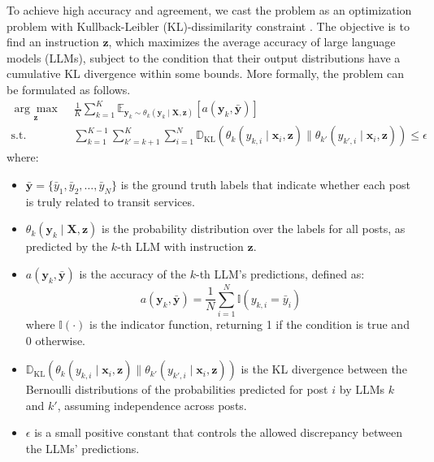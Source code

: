 \documentclass[a4paper,fleqn,12pt]{cas-sc}
\begin{document}
To achieve high accuracy and agreement, we cast the problem as an optimization problem with Kullback-Leibler (KL)-dissimilarity constraint \citep{gultekin2017nonlinear, huang2019novel, liu2024network}. The objective is to find an instruction \(\boldsymbol{z}\), which maximizes the average accuracy of large language models (LLMs), subject to the condition that their output distributions have a cumulative KL divergence within some bounds. More formally, the problem can be formulated as follows.
\begin{equation}
\begin{aligned}
    \underset{\boldsymbol{z}}{\arg\max} \,\, & 
    \frac{1}{K} \sum_{k=1}^{K} \mathbb{E}_{\boldsymbol{y}_{k} \sim \theta_{k}(\boldsymbol{y}_{k} \mid \boldsymbol{X}, \boldsymbol{z})} \left[ a(\boldsymbol{y}_{k}, \boldsymbol{\bar{y}}) \right] \\
    \text{s.t.} \,\, & 
    \sum_{k=1}^{K-1} \sum_{k'=k+1}^{K} \sum_{i=1}^{N} \mathbb{D}_{\text{KL}} \left( \theta_{k}(y_{k,i} \mid \boldsymbol{x}_i, \boldsymbol{z}) \parallel \theta_{k'}(y_{k',i} \mid \boldsymbol{x}_i, \boldsymbol{z}) \right) \leq \epsilon
\end{aligned}
\end{equation}
where:
\begin{itemize}
    \item \(\boldsymbol{\bar{y}} = \{\bar{y}_1, \bar{y}_2, \ldots, \bar{y}_N\}\) is the ground truth labels that indicate whether each post is truly related to transit services.
    \item \(\theta_k(\boldsymbol{y}_k \mid \boldsymbol{X}, \boldsymbol{z})\) is the probability distribution over the labels for all posts, as predicted by the \(k\)-th LLM with instruction \(\boldsymbol{z}\).
    \item \(a(\boldsymbol{y}_{k}, \boldsymbol{\bar{y}})\) is the accuracy of the \(k\)-th LLM's predictions, defined as:
    \begin{equation}
    a(\boldsymbol{y}_{k}, \boldsymbol{\bar{y}}) = \frac{1}{N} \sum_{i=1}^{N} \mathbb{I}(y_{k,i} = \bar{y}_i)
    \end{equation}
    where \(\mathbb{I}(\cdot)\) is the indicator function, returning 1 if the condition is true and 0 otherwise.
    \item \(\mathbb{D}_{\text{KL}} \left( \theta_{k}(y_{k,i} \mid \boldsymbol{x}_i, \boldsymbol{z}) \parallel \theta_{k'}(y_{k',i} \mid \boldsymbol{x}_i, \boldsymbol{z}) \right)\) is the KL divergence between the Bernoulli distributions of the probabilities predicted for post \(i\) by LLMs \(k\) and \(k'\), assuming independence across posts.
    \item \(\epsilon\) is a small positive constant that controls the allowed discrepancy between the LLMs' predictions.
\end{itemize}
\end{document}
